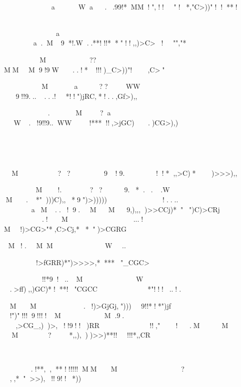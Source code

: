 



aWa..99!*MM!",!!"!*,"C>))"!!**!





	
a
a.M9*!.W..**!!!**"!!,,)>C>!"","*


	
M
??

MMM9!9W..!*!!!)_C>))"!,C>"




M

a??
WW
9!!9......!*!!")jRC,*!..,Gf>),,





.
M
?a
W.!9!!9..WW!***!!,>jGC).)CG>),)




		
M
??
9!9.!!*,,>C)*)>>>),,




M!.

??
9.*...W
M.*")))C),,*9")>)))))

!....
aM..!9.M
M9,),,,)>>CCj)*"")C)>CRj	


.!M

...!
M!)>CG>"*,C>Cj,**")>CGRG


	M!.MM


W..



!>fGRR)*")>>>>,****"_CGC>



!!*9!..M
W


.>ff\R),,)GC)*!**!"CGCC		


*"!!!..!.


MM.!)>GjGj,")))9!!*!*")jf



!")"!!!9!!!!M
M.9.


,>CG_,))>,!!9!!)RR	

!!,"!.M
M
M
?
*,,),))>>)**!!!!!*,,CR








.!**,,**!!!!!!MM
M


?
,,*">>),!!9!!*))





